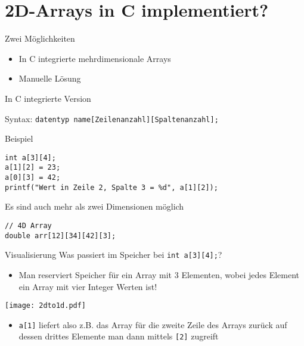 \documentclass[presentation]{beamer}
\begin{document}
\section{2D-Arrays in C implementiert?}
\label{sec:org2698db5}
\begin{frame}[label={sec:orgd545495}]{Zwei Möglichkeiten}
\begin{itemize}
\item In C integrierte mehrdimensionale Arrays
\item Manuelle Lösung
\end{itemize}
\end{frame}
\begin{frame}[label={sec:orgb1f7a8a},fragile]{In C integrierte Version}
 \begin{block}{Syntax:}
{\color{solarizedYellow}\verb!datentyp name[Zeilenanzahl][Spaltenanzahl];!}
\end{block}
\begin{block}{Beispiel}
\begin{verbatim}
int a[3][4];
a[1][2] = 23;
a[0][3] = 42;
printf("Wert in Zeile 2, Spalte 3 = %d", a[1][2]);
\end{verbatim}
\end{block}
\begin{block}{Es sind auch mehr als zwei Dimensionen möglich}
\begin{verbatim}
// 4D Array
double arr[12][34][42][3];
\end{verbatim}
\end{block}
\end{frame}
\begin{frame}[label={sec:orgdfde632},fragile]{Visualisierung}
 Was passiert im Speicher bei {\color{solarizedYellow}\verb!int a[3][4];!}?
\begin{itemize}
\item Man reserviert Speicher für ein \alert{Array mit 3 Elementen}, wobei
\alert{jedes Element ein Array mit vier Integer Werten} ist!
\end{itemize}
\begin{center}
\texttt{[image: 2dto1d.pdf]}
\end{center}
\begin{itemize}
\item {\color{solarizedYellow}\verb!a[1]!} liefert also z.B. das Array für die zweite Zeile des Arrays
zurück auf dessen drittes Elemente man dann mittels {\color{solarizedYellow}\verb![2]!} zugreift
\end{itemize}
\end{frame}
\end{document}
